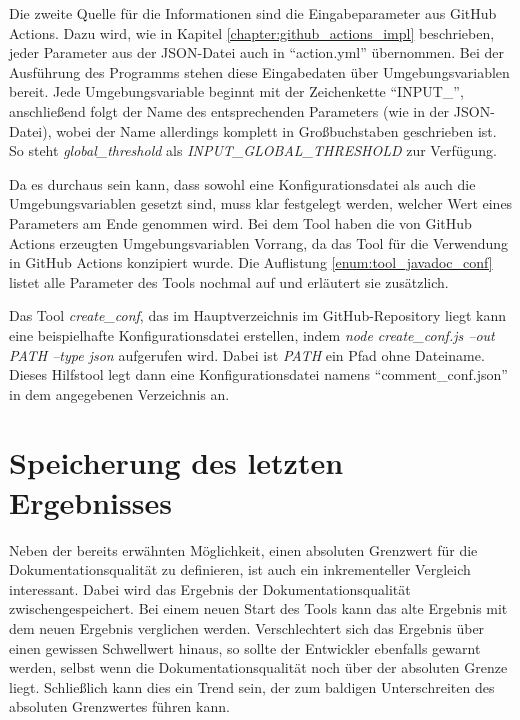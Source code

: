 \bigskip
Die zweite Quelle für die Informationen sind die Eingabeparameter aus GitHub Actions. Dazu wird, wie in Kapitel \ref{chapter:github_actions_impl} beschrieben, jeder Parameter aus der \ac{JSON}-Datei auch in \enquote{action.yml} übernommen. Bei der Ausführung des Programms stehen diese Eingabedaten über Umgebungsvariablen bereit. Jede Umgebungsvariable beginnt mit der Zeichenkette \enquote{INPUT\_}, anschließend folgt der Name des entsprechenden Parameters (wie in der \ac{JSON}-Datei), wobei der Name allerdings komplett in Großbuchstaben geschrieben ist. So steht  \textit{global\_threshold} als \textit{INPUT\_GLOBAL\_THRESHOLD} zur Verfügung.

Da es durchaus sein kann, dass sowohl eine Konfigurationsdatei als auch die Umgebungsvariablen gesetzt sind, muss klar festgelegt werden, welcher Wert eines Parameters am Ende genommen wird. Bei dem Tool haben die von GitHub Actions erzeugten Umgebungsvariablen  Vorrang, da das Tool für die Verwendung in GitHub Actions konzipiert wurde.  Die Auflistung \ref{enum:tool_javadoc_conf} listet alle Parameter des Tools nochmal auf und erläutert sie zusätzlich. 

Das Tool \textit{create\_conf}, das im Hauptverzeichnis im GitHub-Repository liegt kann eine beispielhafte Konfigurationsdatei erstellen, indem \textit{node create\_conf.js --out PATH --type json} aufgerufen wird. Dabei ist \textit{PATH} ein Pfad ohne Dateiname. Dieses Hilfstool legt dann eine Konfigurationsdatei namens \enquote{comment\_conf.json} in dem angegebenen Verzeichnis an. 

\section{Speicherung des letzten Ergebnisses}\label{chapter:saving}
Neben der bereits erwähnten Möglichkeit, einen absoluten Grenzwert für die Dokumentationsqualität zu definieren, ist auch ein inkrementeller Vergleich interessant. Dabei wird das Ergebnis der Dokumentationsqualität zwischengespeichert. Bei einem neuen Start des Tools kann das alte Ergebnis mit dem neuen Ergebnis verglichen werden. Verschlechtert sich das Ergebnis über einen gewissen Schwellwert hinaus, so sollte der Entwickler ebenfalls gewarnt werden, selbst wenn die Dokumentationsqualität noch über der absoluten Grenze liegt. Schließlich kann dies ein Trend sein, der zum baldigen Unterschreiten des absoluten Grenzwertes führen kann. 

